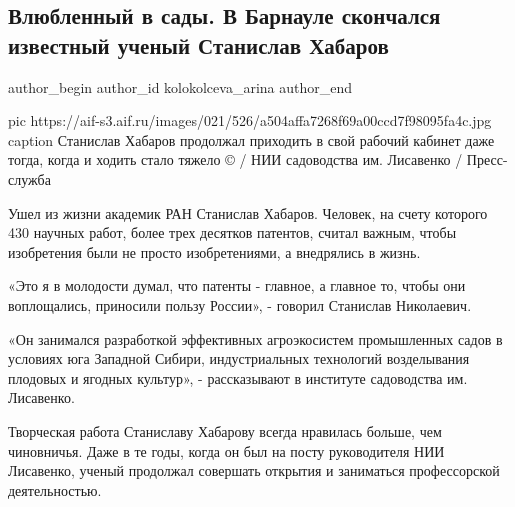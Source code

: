  
 
 
 
 
 
\subsection{Влюбленный в сады. В Барнауле скончался известный ученый Станислав Хабаров}
\label{sec:07_10_2020.news.ru.aif.kolokolceva_arina.1.habarov_smert_russia_altai}
\ifcmt
	author_begin
   author_id kolokolceva_arina
	author_end
\fi


\ifcmt
pic https://aif-s3.aif.ru/images/021/526/a504affa7268f69a00ccd7f98095fa4c.jpg
caption  Станислав Хабаров продолжал приходить в свой рабочий кабинет даже тогда, когда и ходить стало тяжело © / НИИ садоводства им. Лисавенко / Пресс-служба 
\fi

Ушел из жизни академик РАН Станислав Хабаров. Человек, на счету которого 430
научных работ, более трех десятков патентов, считал важным, чтобы изобретения
были не просто изобретениями, а внедрялись в жизнь.

«Это я в молодости думал, что патенты - главное,  а главное то, чтобы они
воплощались, приносили пользу России», - говорил Станислав  Николаевич.

«Он занимался разработкой эффективных агроэкосистем промышленных садов в
условиях юга Западной Сибири, индустриальных технологий возделывания плодовых и
ягодных культур», - рассказывают в институте садоводства им. Лисавенко.

Творческая работа Станиславу Хабарову всегда нравилась больше, чем чиновничья.
Даже в те годы, когда он был на посту руководителя НИИ Лисавенко, ученый
продолжал совершать открытия и заниматься профессорской деятельностью.

